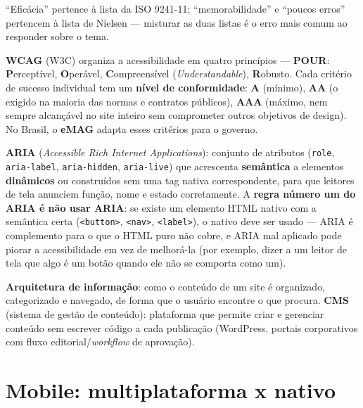 \begin{cuidado}
“Eficácia” pertence à lista da ISO 9241-11; “memorabilidade” e “poucos
erros” pertencem à lista de Nielsen --- misturar as duas listas é o erro
mais comum ao responder sobre o tema.
\end{cuidado}

\begin{conceito}
\textbf{WCAG} (W3C) organiza a acessibilidade em quatro princípios ---
\textbf{POUR}: \textbf{P}erceptível, \textbf{O}perável,
\textbf{C}ompreensível (\textit{Understandable}), \textbf{R}obusto. Cada
critério de sucesso individual tem um \textbf{nível de conformidade}:
\textbf{A} (mínimo), \textbf{AA} (o exigido na maioria das normas e
contratos públicos), \textbf{AAA} (máximo, nem sempre alcançável no site
inteiro sem comprometer outros objetivos de design). No Brasil, o
\textbf{eMAG} adapta esses critérios para o governo.

\textbf{ARIA} (\textit{Accessible Rich Internet Applications}): conjunto
de atributos (\texttt{role}, \texttt{aria-label}, \texttt{aria-hidden},
\texttt{aria-live}) que acrescenta \textbf{semântica} a elementos
\textbf{dinâmicos} ou construídos sem uma tag nativa correspondente, para
que leitores de tela anunciem função, nome e estado corretamente. A
\textbf{regra número um do ARIA é não usar ARIA}: se existe um elemento
HTML nativo com a semântica certa (\texttt{<button>}, \texttt{<nav>},
\texttt{<label>}), o nativo deve ser usado --- ARIA é complemento para o
que o HTML puro não cobre, e ARIA mal aplicado pode piorar a
acessibilidade em vez de melhorá-la (por exemplo, dizer a um leitor de
tela que algo é um botão quando ele não se comporta como um).
\end{conceito}

\begin{conceito}
\textbf{Arquitetura de informação}: como o conteúdo de um site é
organizado, categorizado e navegado, de forma que o usuário encontre o
que procura. \textbf{CMS} (sistema de gestão de conteúdo): plataforma que
permite criar e gerenciar conteúdo sem escrever código a cada publicação
(WordPress, portais corporativos com fluxo editorial/\textit{workflow}
de aprovação).
\end{conceito}

\section{Mobile: multiplataforma x nativo}

